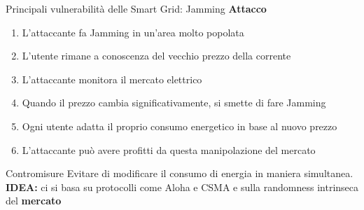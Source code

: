 \begin{frame}{Principali vulnerabilità delle Smart Grid: Jamming}
	\textbf{Attacco}
	\begin{enumerate}[<+- | alert@+>]
		\item L'attaccante fa Jamming in un'area molto popolata
		\item L'utente rimane a conoscenza del vecchio prezzo della corrente
		\item L'attaccante monitora il mercato elettrico
		\item Quando il prezzo cambia significativamente, si smette di fare Jamming
		\item Ogni utente adatta il proprio consumo energetico in base al nuovo prezzo
		\item L'attaccante può avere profitti da questa manipolazione del mercato
	\end{enumerate}
	\pause
	\begin{block}{Contromisure}
		Evitare di modificare il consumo di energia in maniera simultanea.\newline
		\textbf{\color{blue_slides}IDEA: } ci si basa su protocolli come Aloha e CSMA e sulla randomness intrinseca del \textbf{\color{blue_slides}mercato}
	\end{block}
\end{frame}